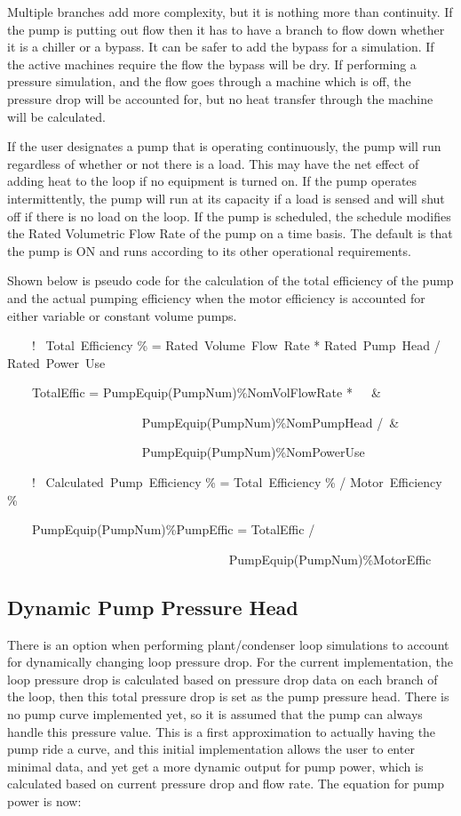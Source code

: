 Multiple branches add more complexity, but it is nothing more than continuity. If the pump is putting out flow then it has to have a branch to flow down whether it is a chiller or a bypass. It can be safer to add the bypass for a simulation. If the active machines require the flow the bypass will be dry. If performing a pressure simulation, and the flow goes through a machine which is off, the pressure drop will be accounted for, but no heat transfer through the machine will be calculated.

If the user designates a pump that is operating continuously, the pump will run regardless of whether or not there is a load. This may have the net effect of adding heat to the loop if no equipment is turned on. If the pump operates intermittently, the pump will run at its capacity if a load is sensed and will shut off if there is no load on the loop. If the pump is scheduled, the schedule modifies the Rated Volumetric Flow Rate of the pump on a time basis. The default is that the pump is ON and runs according to its other operational requirements.

Shown below is pseudo code for the calculation of the total efficiency of the pump and the actual pumping efficiency when the motor efficiency is accounted for either variable or constant volume pumps.

~~~~!~ Total~Efficiency \% = Rated~Volume~Flow~Rate * Rated~Pump~Head / Rated~Power~Use

~~~~TotalEffic = PumpEquip(PumpNum)\%NomVolFlowRate *~~~\&

~~~~~~~~~~~~~~~~~~~~~ PumpEquip(PumpNum)\%NomPumpHead /~\&

~~~~~~~~~~~~~~~~~~~~~ PumpEquip(PumpNum)\%NomPowerUse

~~~~!~ Calculated~Pump~Efficiency \% = Total~Efficiency \% / Motor~Efficiency \%

~~~~PumpEquip(PumpNum)\%PumpEffic = TotalEffic /

~~~~~~~~~~~~~~~~~~~~~~~~~~~~~~~~~~~ PumpEquip(PumpNum)\%MotorEffic

\subsection{Dynamic Pump Pressure Head}\label{dynamic-pump-pressure-head}

There is an option when performing plant/condenser loop simulations to account for dynamically changing loop pressure drop. For the current implementation, the loop pressure drop is calculated based on pressure drop data on each branch of the loop, then this total pressure drop is set as the pump pressure head. There is no pump curve implemented yet, so it is assumed that the pump can always handle this pressure value. This is a first approximation to actually having the pump ride a curve, and this initial implementation allows the user to enter minimal data, and yet get a more dynamic output for pump power, which is calculated based on current pressure drop and flow rate. The equation for pump power is now:

